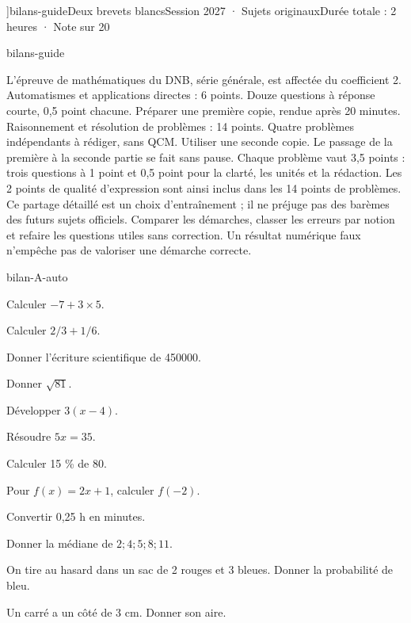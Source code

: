 \editionPage[\pdfbookmark[0]{Deux brevets blancs}{bm-bilans-guide-parent}]{bilans-guide}{Deux brevets blancs}{Session 2027 · Sujets originaux}{Durée totale : 2 heures · Note sur 20}
\begin{blocEdition}{bilans-guide}

L’épreuve de mathématiques du DNB, série générale, est affectée du coefficient 2.
Automatismes et applications directes : 6 points. Douze questions à réponse courte,
0,5 point chacune. Préparer une première copie, rendue après 20 minutes.
Raisonnement et résolution de problèmes : 14 points. Quatre problèmes
indépendants à rédiger, sans QCM. Utiliser une seconde copie. Le passage
de la première à la seconde partie se fait sans pause.
Chaque problème vaut 3,5 points : trois questions à 1 point et 0,5 point
pour la clarté, les unités et la rédaction. Les 2 points de qualité
d’expression sont ainsi inclus dans les 14 points de problèmes.
Ce partage détaillé est un choix d’entraînement ; il ne préjuge pas
des barèmes des futurs sujets officiels.
Comparer les démarches, classer les erreurs par notion et refaire les
questions utiles sans correction. Un résultat numérique faux n’empêche
pas de valoriser une démarche correcte.

\end{blocEdition}
\begin{blocEdition}{bilan-A-auto}
\begin{questions}
\item Calculer $-7+3\times5$.
\item Calculer $2/3+1/6$.
\item Donner l’écriture scientifique de 450000.
\item Donner $\sqrt{81}$.
\item Développer $3(x-4)$.
\item Résoudre $5x=35$.
\item Calculer 15 \% de 80.
\item Pour $f(x)=2x+1$, calculer $f(-2)$.
\item Convertir 0,25 h en minutes.
\item Donner la médiane de $2;4;5;8;11$.
\item On tire au hasard dans un sac de 2 rouges et 3 bleues. Donner la probabilité de bleu.
\item Un carré a un côté de 3 cm. Donner son aire.\end{questions}
\end{blocEdition}
